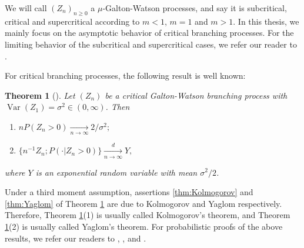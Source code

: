 \documentclass[UTF8]{pkuthss}
\theoremstyle{plain}
\newtheorem{thm}{Theorem}[section]
\theoremstyle{definition}
\numberwithin{equation}{section}
\begin{document}
	We will call $(Z_n)_{n\geq 0}$ a $\mu$-Galton-Watson processes, and say it is subcritical, critical and supercritical according to $m < 1$, $m = 1$ and $m >1$. 
	In this thesis, we mainly focus on the asymptotic behavior of critical branching processes. 
	For the limiting behavior of the subcritical and supercritical cases, we refer our reader to \cite{AthreyaNey1972Branching}.

	For critical branching processes, the following result is well known:
\begin{thm}[\cite{KestenNeySpitzer1966The-Galton-Watson}] 
\label{thm: Kolmogorov and Yaglom theorem}
	Let $(Z_n)$ be a critical Galton-Watson branching process with $\operatorname{Var}(Z_1) = \sigma^2 \in (0,\infty)$. Then
	\begin{enumerate}
		\item \label{thm:Kolmogorov} 
		$n P (Z_n>0) \xrightarrow[n \to \infty]{} 2/\sigma^2;$
		\item \label{thm:Yaglom}
		$\{n^{-1}Z_n; P(\cdot | Z_n>0)\}\xrightarrow[n \to \infty]{d} Y,$
	\end{enumerate}
	where $Y$ is an exponential random variable with mean $\sigma^2/2$.
\end{thm}

\begin{comment}
\begin{thm}
\label{thm: Kolmogorov and Yaglom theorem}
	Let $(Z_n)$ be a critical Galton-Watson branching process with $\operatorname{Var}(Z_1) = 2c \in (0,\infty)$. Then 
\begin{itemize}
\item[(1)]
	$n P(Z_n > 0)\xrightarrow[n\to \infty]{} c^{-1}$,
\item[(2)]
	$P_1(n^{-1}Z_n > r|Z_n >0) \xrightarrow[n\to \infty]{} e^{-r/c}, \quad r\geq 0$.
\end{itemize}
\end{thm}
\end{comment}
	Under a third moment assumption, assertions \eqref{thm:Kolmogorov} and \eqref{thm:Yaglom} of Theorem \ref{thm: Kolmogorov and Yaglom theorem} are due to Kolmogorov \cite{Kolmogorov1938Zur-losung} and Yaglom \cite{Yaglom1947Certain} respectively.
	Therefore, Theorem \ref{thm: Kolmogorov and Yaglom theorem}(1) is usually called Kolmogorov's theorem, and Theorem \ref{thm: Kolmogorov and Yaglom theorem}(2) is usually called Yaglom's theorem.
	For probabilistic proofs of the above results, we refer our readers to \cite{Geiger1999Elementary}, \cite{Geiger2000A-new}, \cite{LyonsPemantlePeres1995Conceptual} and \cite{RenSongSun2018A-2-spine}. 
\end{document}
